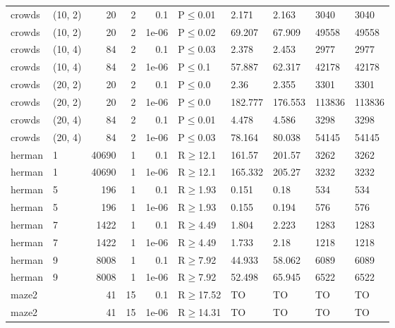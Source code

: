 \begin{longtable}{llrrrlllll}
 crowds        & (10, 2)   &     	20 &   2 & 0.1   & P$\leq$0.01  & 2.171    & 2.163    & 3040   & 3040   \\
 crowds        & (10, 2)   &     	20 &   2 & 1e-06 & P$\leq$0.02  & 69.207   & 67.909   & 49558  & 49558  \\
 crowds        & (10, 4)   &     	84 &   2 & 0.1   & P$\leq$0.03  & 2.378    & 2.453    & 2977   & 2977   \\
 crowds        & (10, 4)   &     	84 &   2 & 1e-06 & P$\leq$0.1   & 57.887   & 62.317   & 42178  & 42178  \\
 crowds        & (20, 2)   &     	20 &   2 & 0.1   & P$\leq$0.0   & 2.36     & 2.355    & 3301   & 3301   \\
 crowds        & (20, 2)   &     	20 &   2 & 1e-06 & P$\leq$0.0   & 182.777  & 176.553  & 113836 & 113836 \\
 crowds        & (20, 4)   &     	84 &   2 & 0.1   & P$\leq$0.01  & 4.478    & 4.586    & 3298   & 3298   \\
 crowds        & (20, 4)   &     	84 &   2 & 1e-06 & P$\leq$0.03  & 78.164   & 80.038   & 54145  & 54145  \\
 herman        & 1         &  	40690 &   1 & 0.1   & R$\geq$12.1  & 161.57   & 201.57   & 3262   & 3262   \\
 herman        & 1         &  	40690 &   1 & 1e-06 & R$\geq$12.1  & 165.332  & 205.27   & 3232   & 3232   \\
 herman        & 5         &    	196 &   1 & 0.1   & R$\geq$1.93  & 0.151    & 0.18     & 534    & 534    \\
 herman        & 5         &    	196 &   1 & 1e-06 & R$\geq$1.93  & 0.155    & 0.194    & 576    & 576    \\
 herman        & 7         &   	1422 &   1 & 0.1   & R$\geq$4.49  & 1.804    & 2.223    & 1283   & 1283   \\
 herman        & 7         &   	1422 &   1 & 1e-06 & R$\geq$4.49  & 1.733    & 2.18     & 1218   & 1218   \\
 herman        & 9         &   	8008 &   1 & 0.1   & R$\geq$7.92  & 44.933   & 58.062   & 6089   & 6089   \\
 herman        & 9         &   	8008 &   1 & 1e-06 & R$\geq$7.92  & 52.498   & 65.945   & 6522   & 6522   \\
 maze2         &           &     	41 &  15 & 0.1   & R$\geq$17.52 & TO       & TO       & TO     & TO     \\
 maze2         &           &     	41 &  15 & 1e-06 & R$\geq$14.31 & TO       & TO       & TO     & TO     \\

\end{longtable}
